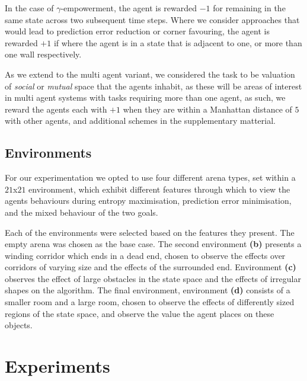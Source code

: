 \documentclass{article}
\begin{document}
In the case of $\gamma$-empowerment, the agent is rewarded $-1$ for remaining in the same state across two subsequent time steps. Where we consider approaches that would lead to prediction error reduction or corner favouring, the agent is rewarded $+1$ if where the agent is in a state that is adjacent to one, or more than one wall respectively.

As we extend to the multi agent variant, we considered the task to be valuation of \emph{social} or \emph{mutual} space that the agents inhabit, as these will be areas of interest in multi agent systems with tasks requiring more than one agent, as such, we reward the agents each with $+1$ when they are within a Manhattan distance of $5$ with other agents, and additional schemes in the supplementary matterial.

\subsection{Environments}

For our experimentation we opted to use four different arena types, set within a $21$x$21$ environment, which exhibit different features through which to view the agents behaviours during entropy maximisation, prediction error minimisation, and the mixed behaviour of the two goals.

Each of the environments were selected based on the features they present. The empty arena was chosen as the base case. The second environment \textbf{(b)} presents a winding corridor which ends in a dead end, chosen to observe the effects over corridors of varying size and the effects of the surrounded end. Environment \textbf{(c)} observes the effect of large obstacles in the state space and the effects of irregular shapes on the algorithm. The final environment, environment \textbf{(d)} consists of a smaller room and a large room, chosen to observe the effects of differently sized regions of the state space, and observe the value the agent places on these objects. 

\section{Experiments\label{Results}}

\end{document}
